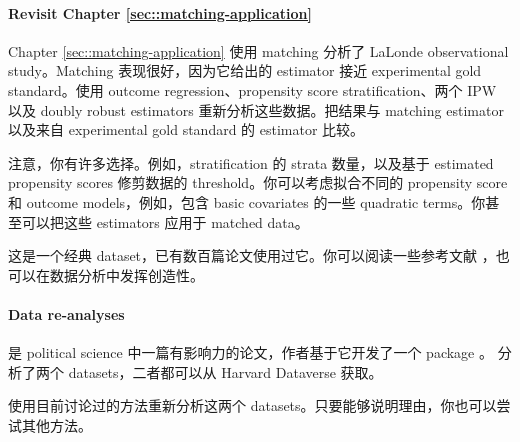  


\paragraph{Revisit Chapter \ref{sec::matching-application}}


Chapter \ref{sec::matching-application} 使用 matching 分析了 LaLonde observational study。Matching 表现很好，因为它给出的 estimator 接近 experimental gold standard。使用 outcome regression、propensity score stratification、两个 IPW 以及 doubly robust estimators 重新分析这些数据。把结果与 matching estimator 以及来自 experimental gold standard 的 estimator 比较。

注意，你有许多选择。例如，stratification 的 strata 数量，以及基于 estimated propensity scores 修剪数据的 threshold。你可以考虑拟合不同的 propensity score 和 outcome models，例如，包含 basic covariates 的一些 quadratic terms。你甚至可以把这些 estimators 应用于 matched data。

这是一个经典 dataset，已有数百篇论文使用过它。你可以阅读一些参考文献 \citep{dehejia1999causal, hainmueller2012entropy}，也可以在数据分析中发挥创造性。



\paragraph{Data re-analyses}

\citet{ho2007matching} 是 political science 中一篇有影响力的论文，作者基于它开发了一个  package  \citep{ho2011matchit}。\citet{ho2007matching} 分析了两个 datasets，二者都可以从 Harvard Dataverse 获取。

使用目前讨论过的方法重新分析这两个 datasets。只要能够说明理由，你也可以尝试其他方法。



 

 

